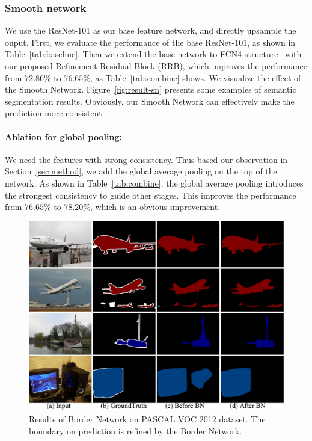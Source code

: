 \documentclass[10pt,twocolumn,letterpaper]{article}
\begin{document}
\subsubsection{Smooth network}
We use the ResNet-101 as our base feature network, and directly upsample the ouput. First, we evaluate the performance of the base ResNet-101, as shown in Table~\ref{tab:baseline}. Then we extend the base network to FCN4 structure~\cite{Long-CVPR-FCN-2015, Xie-ICCV-HEAD-2015} with our proposed Refinement Residual Block (RRB), which improves the performance from $72.86\%$ to $76.65\%$, as Table~\ref{tab:combine} shows. We visualize the effect of the Smooth Network. Figure~\ref{fig:result-sn} presents some examples of semantic segmentation results. Obviously, our Smooth Network can effectively make the prediction more consistent.

\vspace{-2ex}    
\paragraph{Ablation for global pooling:} We need the features with strong consistency. Thus based our observation in Section~\ref{sec:method}, we add the global average pooling on the top of the network. As shown in Table~\ref{tab:combine}, the global average pooling introduces the strongest consistency to guide other stages. This improves the performance from $76.65\%$ to $78.20\%$, which is an obvious improvement.

\begin{figure}[t]
\centering
\includegraphics[width=\linewidth]{res-bn.pdf}
\caption{Results of Border Network on PASCAL VOC 2012 dataset. The boundary on prediction is refined by the Border Network.}
\label{fig:result-bn}
\end{figure}
\end{document}
